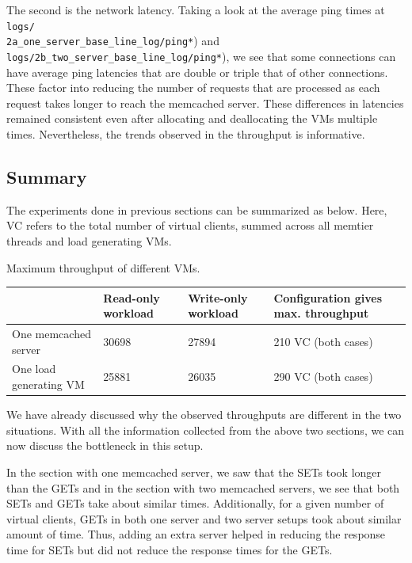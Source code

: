 \documentclass[11pt,a4paper]{article}
\begin{document}
The second is the network latency. Taking a look at the average ping times at \texttt{logs/\\2a\_one\_server\_base\_line\_log/ping*}) and \texttt{logs/2b\_two\_server\_base\_line\_log/ping*}), we see that some connections can have average ping latencies that are double or triple that of other connections. These factor into reducing the number of requests that are processed as each request takes longer to reach the memcached server. These differences in latencies remained consistent even after allocating and deallocating the VMs multiple times. Nevertheless, the trends observed in the throughput is informative.


\subsection{Summary}

The experiments done in previous sections can be summarized as below. Here, VC refers to the total number of virtual clients, summed across all memtier threads and load generating VMs.

\begin{center}
	{Maximum throughput of different VMs.}
	\begin{tabular}{|l|p{2cm}|p{2cm}|p{4cm}|}
		\hline                        & Read-only workload & Write-only workload & Configuration gives max. throughput \\ 
		\hline One memcached server   & 30698 & 27894 & 210 VC (both cases)  \\ 
		\hline One load generating VM & 25881 & 26035 & 290 VC (both cases)  \\ 
		\hline 
	\end{tabular}
\end{center}

We have already discussed why the observed throughputs are different in the two situations. With all the information collected from the above two sections, we can now discuss the bottleneck in this setup. 

In the section with one memcached server, we saw that the SETs took longer than the GETs and in the section with two memcached servers, we see that both SETs and GETs take about similar times. Additionally, for a given number of virtual clients, GETs in both one server and two server setups took about similar amount of time. Thus, adding an extra server helped in reducing the response time for SETs but did not reduce the response times for the GETs.
\end{document}
